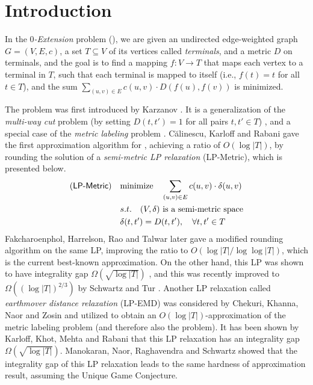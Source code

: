 \section{Introduction}

In the \emph{$0$-Extension} problem (\ze), we are given an undirected edge-weighted graph $G=(V,E,c)$, a set $T\subseteq V$ of its vertices called \emph{terminals}, and a metric $D$ on terminals, and the goal is to find a mapping $f: V\to T$ that maps each vertex to a terminal in $T$, such that each terminal is mapped to itself (i.e., $f(t)=t$ for all $t\in T$), and the sum $\sum_{(u,v)\in E}c{(u,v)}\cdot D(f(u),f(v))$ is minimized.

The \ze problem was first introduced by Karzanov \cite{karzanov1998minimum}. It is a generalization of the \emph{multi-way cut} problem (by setting $D(t,t')=1$ for all pairs $t,t'\in T$) \cite{dahlhaus1994complexity,cualinescu1998improved,freund2000lower,buchbinder2013simplex,angelidakis2017improved,buchbinder2017simplex,berczi2020improving}, and a special case of the \emph{metric labeling} problem \cite{kleinberg2002approximation,chekuri2004linear,archer2004approximate,karloff2006earthmover,chuzhoy2007hardness}.
C\u{a}linescu, Karloff and Rabani \cite{calinescu2005approximation} gave the first approximation algorithm for \ze, achieving a ratio of $O(\log |T|)$, by rounding the solution of a \emph{semi-metric LP relaxation} (\textsf{LP-Metric}), which is presented below.
%
\begin{eqnarray*}
	\mbox{(\textsf{LP-Metric})}\quad &  \text{minimize}\quad  \sum_{(u,v)\in E}c(u,v)\cdot \delta(u,v)\\
	& s.t. \quad (V,\delta) \text{ is a semi-metric space}\\
	& \delta(t,t')=D(t,t'), \quad\forall t,t'\in T
\end{eqnarray*}
Fakcharoenphol, Harrelson, Rao and
Talwar \cite{fakcharoenphol2003improved} later gave a modified rounding algorithm on the same LP, improving the ratio to $O(\log |T|/\log\log |T|)$, which is the current best-known approximation. On the other hand, this LP was shown to have integrality gap $\Omega(\sqrt{\log |T|})$ \cite{calinescu2005approximation}, and this was recently improved to $\Omega((\log |T|)^{2/3})$ by Schwartz and Tur \cite{schwartz2021metric}.
Another LP relaxation called \emph{earthmover distance relaxation} (\textsf{LP-EMD}) was considered by Chekuri, Khanna, Naor and Zosin \cite{chekuri2004linear} and utilized to obtain an $O(\log |T|)$-approximation of the metric labeling problem (and therefore also the \ze problem). It has been shown \cite{karloff2009earthmover} by Karloff, Khot, Mehta and Rabani that this LP relaxation has an integrality gap $\Omega(\sqrt{\log |T|})$. Manokaran, Naor, Raghavendra
and Schwartz \cite{manokaran2008sdp} showed that the integrality gap of this LP relaxation leads to the same hardness of approximation result, assuming the Unique Game Conjecture.


